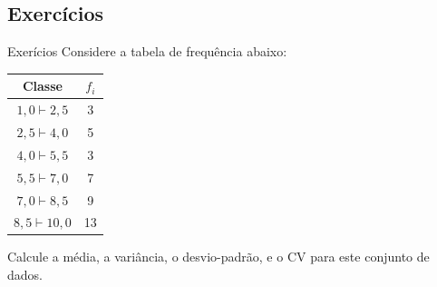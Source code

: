 \documentclass[10pt]{beamer}\usepackage[]{graphicx}\usepackage[]{color}
\theoremstyle{definition}
\begin{document}
\subsection{Exercícios}

\begin{frame}{Exerícios}
  Considere a tabela de frequência abaixo:
  \begin{table}[h]
    \centering
    \begin{tabular}{cc}
      \hline
      Classe & $f_i$ \\
      \hline
      $1,0 \vdash 2,5$ & 3 \\
      $2,5 \vdash 4,0$ & 5 \\
      $4,0 \vdash 5,5$ & 3 \\
      $5,5 \vdash 7,0$ & 7 \\
      $7,0 \vdash 8,5$ & 9 \\
      $8,5 \vdash 10,0$ & 13 \\
      \hline
    \end{tabular}
  \end{table}
  Calcule a média, a variância, o desvio-padrão, e o CV para este
  conjunto de dados.
\end{frame}





\end{document}
